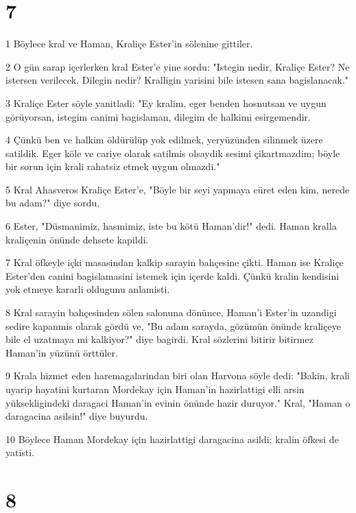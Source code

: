 \chapter{7}

\par 1 Böylece kral ve Haman, Kraliçe Ester'in sölenine gittiler.
\par 2 O gün sarap içerlerken kral Ester'e yine sordu: "Istegin nedir, Kraliçe Ester? Ne istersen verilecek. Dilegin nedir? Kralligin yarisini bile istesen sana bagislanacak."
\par 3 Kraliçe Ester söyle yanitladi: "Ey kralim, eger benden hosnutsan ve uygun görüyorsan, istegim canimi bagislaman, dilegim de halkimi esirgemendir.
\par 4 Çünkü ben ve halkim öldürülüp yok edilmek, yeryüzünden silinmek üzere satildik. Eger köle ve cariye olarak satilmis olsaydik sesimi çikartmazdim; böyle bir sorun için krali rahatsiz etmek uygun olmazdi."
\par 5 Kral Ahasveros Kraliçe Ester'e, "Böyle bir seyi yapmaya cüret eden kim, nerede bu adam?" diye sordu.
\par 6 Ester, "Düsmanimiz, hasmimiz, iste bu kötü Haman'dir!" dedi. Haman kralla kraliçenin önünde dehsete kapildi.
\par 7 Kral öfkeyle içki masasindan kalkip sarayin bahçesine çikti. Haman ise Kraliçe Ester'den canini bagislamasini istemek için içerde kaldi. Çünkü kralin kendisini yok etmeye kararli oldugunu anlamisti.
\par 8 Kral sarayin bahçesinden sölen salonuna dönünce, Haman'i Ester'in uzandigi sedire kapanmis olarak gördü ve, "Bu adam sarayda, gözümün önünde kraliçeye bile el uzatmaya mi kalkiyor?" diye bagirdi. Kral sözlerini bitirir bitirmez Haman'in yüzünü örttüler.
\par 9 Krala hizmet eden haremagalarindan biri olan Harvona söyle dedi: "Bakin, krali uyarip hayatini kurtaran Mordekay için Haman'in hazirlattigi elli arsin yüksekligindeki daragaci Haman'in evinin önünde hazir duruyor." Kral, "Haman o daragacina asilsin!" diye buyurdu.
\par 10 Böylece Haman Mordekay için hazirlattigi daragacina asildi; kralin öfkesi de yatisti.

\chapter{8}

